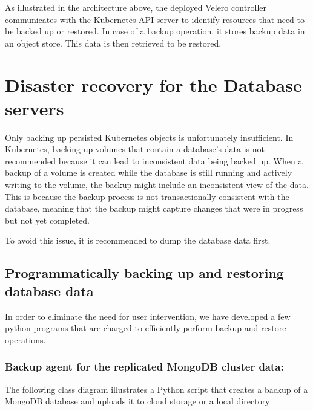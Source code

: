 As illustrated in the architecture above, the deployed Velero controller communicates with the Kubernetes API server to identify resources that need to be backed up or restored. In case of a backup operation, it stores backup data in an object store. This data is then retrieved to be restored. 

 

\section{Disaster recovery for the Database servers }

Only backing up persisted Kubernetes objects is unfortunately insufficient. In Kubernetes, backing up volumes that contain a database's data is not recommended because it can lead to inconsistent data being backed up. When a backup of a volume is created while the database is still running and actively writing to the volume, the backup might include an inconsistent view of the data. This is because the backup process is not transactionally consistent with the database, meaning that the backup might capture changes that were in progress but not yet completed. 

To avoid this issue, it is recommended to dump the database data first. 

 \subsection{Programmatically backing up and restoring database data }

In order to eliminate the need for user intervention, we have developed a few python programs that are charged to efficiently perform backup and restore operations. 

\subsubsection{Backup agent for the replicated MongoDB cluster data: }

The following class diagram illustrates a Python script that creates a backup of a MongoDB database and uploads it to cloud storage or a local directory: 

